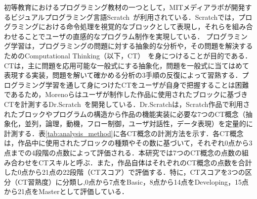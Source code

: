 \documentclass[submit,ses,noauthor]{ipsj}
\begin{document}
初等教育におけるプログラミング教材の一つとして，MITメディアラボが開発するビジュアルプログラミング言語Scratch~\cite{Resnick_2009}が利用されている．Scratchでは，プログラミングにおける命令処理を視覚的なブロックとして表現し，それらを組み合わせることでユーザの直感的なプログラム制作を実現している．
プログラミング学習は，プログラミングの問題に対する抽象的な分析や，その問題を解決するためのComputational Thinking（以下，CT）~\cite{Wing_2006}を身につけることが目的である．CTは，主に問題を応用可能な一般式にする抽象化，問題を一般式に当てはめて表現する実装，問題を解いて確かめる分析の3手順の反復によって習熟する．プログラミング学習を通して身につけたCTをユーザが自身で把握することは困難であるため，Morenoらはユーザが制作した作品に使用されたブロックに基づきCTを計測するDr.Scratch~\cite{Moreno_2015}を開発している．Dr.Scratchは，Scratch作品で利用されたブロックやプログラムの構造から作品の機能実装に必要な7つのCT概念（抽象化，並列，論理，動機，フロー制御，ユーザ対話性，データ表現）を定量的に計測する．表\ref{tab:analysis_method}に各CT概念の計測方法を示す．各CT概念は，作品中に使用されたブロックの種類やその数に基づいて，それぞれ0点から3点までの4段階の点数によって評価される．本研究では7つのCT概念の点数の組み合わせをCTスキルと呼ぶ．また，作品自体はそれぞれのCT概念の点数を合計した0点から21点の22段階（CTスコア）で評価する．特に，CTスコアを3つの区分（CT習熟度）に分類し,0点から7点をBasic，8点から14点をDeveloping，15点から21点をMasterとして評価している．
\end{document}
